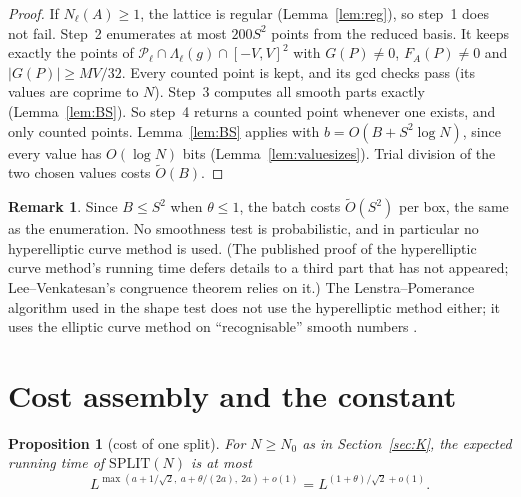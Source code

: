 \documentclass[11pt]{amsart}
\newtheorem{proposition}[theorem]{Proposition}
\theoremstyle{definition}
\newtheorem{remark}[theorem]{Remark}
\newcommand{\cP}{\mathcal{P}}
\begin{document}
\begin{proof}
If $N_\ell(A)\ge1$, the lattice is regular (Lemma~\ref{lem:reg}), so step~1 does not fail. Step~2 enumerates at most $200S^2$ points from the reduced
basis. It keeps exactly the points of $\cP_\ell\cap\Lambda_\ell(g)\cap[-V,V]^2$ with $G(P)\ne0$, $F_A(P)\ne0$ and $|G(P)|\ge MV/32$. Every counted point is
kept, and its gcd checks pass (its values are coprime to $N$). Step~3 computes all smooth parts exactly (Lemma~\ref{lem:BS}). So step~4 returns
a counted point whenever one exists, and only counted points. Lemma~\ref{lem:BS} applies with $b=O(B+S^2\log N)$, since every value has
$O(\log N)$ bits (Lemma~\ref{lem:valuesizes}). Trial division of the two chosen values costs $\tilde O(B)$.
\end{proof}

\begin{remark}
Since $B\le S^2$ when $\theta\le1$, the batch costs $\tilde O(S^2)$ per box, the same as the enumeration. No smoothness test is
probabilistic, and in particular no hyperelliptic curve method is used. (The published proof of the hyperelliptic
curve method's running time \cite{lpp1993,lpp2002} defers details to a third part that has not appeared; Lee--Venkatesan's congruence theorem relies on it.)
The Lenstra--Pomerance algorithm used in the shape test does not use the hyperelliptic method either; it uses the elliptic
curve method on ``recognisable'' smooth numbers \cite[\S7]{lp1992}.
\end{remark}

\section{Cost assembly and the constant}\label{sec:cost}

\begin{proposition}[cost of one split]\label{prop:cost}
For $N\ge N_0$ as in Section~\ref{sec:K}, the expected running time of $\mathrm{SPLIT}(N)$ is at most
\[
L^{\max(a+1/\sqrt2,\ a+\theta/(2a),\ 2a)+o(1)}=L^{(1+\theta)/\sqrt2+o(1)}.
\]
\end{proposition}
\end{document}
